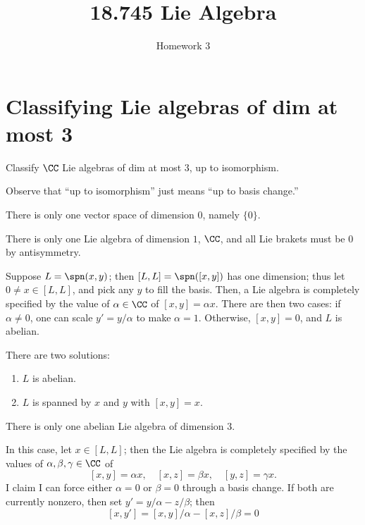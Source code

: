 \documentclass[11pt, headheight=30pt]{scrartcl}
\title{18.745 Lie Algebra}
\subtitle{Homework 3}
\begin{document}
\section{Classifying Lie algebras of dim at most 3}
\begin{prob}
    Classify $\CC$ Lie algebras of dim at most $3$, up to isomorphism.
\end{prob}

Observe that ``up to isomorphism'' just means ``up to basis change.''

\begin{rcase*}
    [Dimension $0$]
\end{rcase*}
There is only one vector space of dimension $0$, namely $\{0\}$.

\begin{rcase*}
    [Dimension $1$]
\end{rcase*}
There is only one Lie algebra of dimension $1$, $\CC$, and all Lie brakets
must be $0$ by antisymmetry.

\begin{rcase*}
    [Dimension $2$]
\end{rcase*}
Suppose $L = \spn(x,y)$; then $[L, L] = \spn([x,y])$ has one dimension;
thus let $0\neq x\in [L,L]$, and pick any $y$ to fill the basis.
Then, a Lie algebra is completely specified by the value of $\alpha\in \CC$
of $[x,y] = \alpha x$. There are then two cases: if $\alpha\neq 0$,
one can scale $y' = y/\alpha$ to make $\alpha = 1$. Otherwise,
$[x,y] = 0$, and $L$ is abelian.

There are two solutions:
\begin{enumerate}
    \item $L$ is abelian.
    \item $L$ is spanned by $x$ and $y$ with $[x,y] = x$.
\end{enumerate}

\begin{rcase*}
\end{rcase*}
There is only one abelian Lie algebra of dimension $3$.

\begin{rcase*}
\end{rcase*}
In this case, let $x\in [L,L]$; then the Lie algebra is
completely specified by the values of $\alpha,\beta,\gamma\in \CC$
of
\[
    [x,y] = \alpha x,\quad [x,z] = \beta x,\quad [y,z] = \gamma x.    
\]
I claim I can force either $\alpha = 0$ or $\beta = 0$
through a basis change. If both are currently nonzero,
then set $y' = y/\alpha - z/\beta$; then
\[
    [x,y'] = [x,y] / \alpha - [x,z]/\beta = 0    
\]
\end{document}
